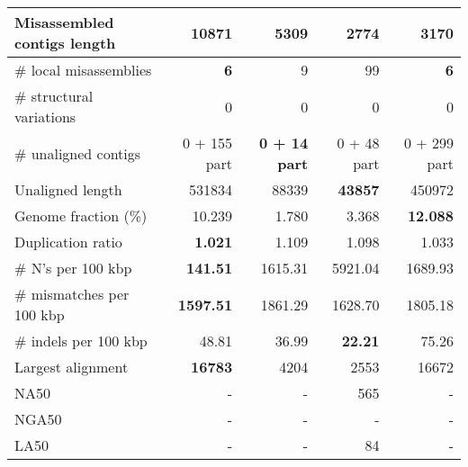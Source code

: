 \documentclass[12pt,a4paper]{article}
\begin{document}
\begin{table}[ht]
\begin{center}
\begin{tabular}{|l*{4}{|r}|}
Misassembled contigs length & 10871 & 5309 & {\bf 2774} & 3170 \\ \hline
\# local misassemblies & {\bf 6} & 9 & 99 & {\bf 6} \\ \hline
\# structural variations & 0 & 0 & 0 & 0 \\ \hline
\# unaligned contigs & 0 + 155 part & {\bf 0 + 14 part} & 0 + 48 part & 0 + 299 part \\ \hline
Unaligned length & 531834 & 88339 & {\bf 43857} & 450972 \\ \hline
Genome fraction (\%) & 10.239 & 1.780 & 3.368 & {\bf 12.088} \\ \hline
Duplication ratio & {\bf 1.021} & 1.109 & 1.098 & 1.033 \\ \hline
\# N's per 100 kbp & {\bf 141.51} & 1615.31 & 5921.04 & 1689.93 \\ \hline
\# mismatches per 100 kbp & {\bf 1597.51} & 1861.29 & 1628.70 & 1805.18 \\ \hline
\# indels per 100 kbp & 48.81 & 36.99 & {\bf 22.21} & 75.26 \\ \hline
Largest alignment & {\bf 16783} & 4204 & 2553 & 16672 \\ \hline
NA50 & - & - & 565 & - \\ \hline
NGA50 & - & - & - & - \\ \hline
LA50 & - & - & 84 & - \\ \hline
\end{tabular}
\end{center}
\end{table}
\end{document}
